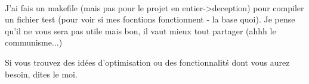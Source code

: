 \documentclass{article}
\begin{document}
\paragraph{}

J'ai fais un makefile (mais pas pour le projet en entier->deception) pour compiler un fichier test (pour voir si mes focntions fonctionnent - la base quoi). Je pense qu'il ne vous sera pas utile mais bon, il vaut mieux tout partager (ahhh le communisme...)

Si vous trouvez des id\'ees d'optimisation ou des fonctionnalit\'s dont vous aurez besoin, dites le moi.
\end{document}
